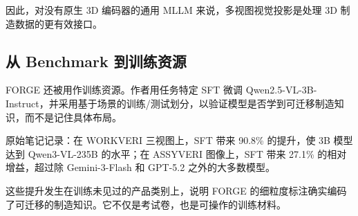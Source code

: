 因此，对没有原生 3D 编码器的通用 MLLM 来说，多视图视觉投影是处理 3D 制造数据的更有效接口。

\subsection{从 Benchmark 到训练资源}

FORGE 还被用作训练资源。作者用任务特定 SFT 微调 Qwen2.5-VL-3B-Instruct，并采用基于场景的训练/测试划分，以验证模型是否学到可迁移制造知识，而不是记住具体布局。

原始笔记记录：在 WORKVERI 三视图上，SFT 带来 90.8\% 的提升，使 3B 模型达到 Qwen3-VL-235B 的水平；在 ASSYVERI 图像上，SFT 带来 27.1\% 的相对增益，超过除 Gemini-3-Flash 和 GPT-5.2 之外的大多数模型。

这些提升发生在训练未见过的产品类别上，说明 FORGE 的细粒度标注确实编码了可迁移的制造知识。它不仅是考试卷，也是可操作的训练材料。
